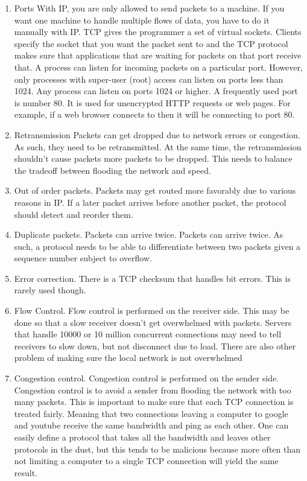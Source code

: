 \begin{enumerate}
  \item \gls{Ports}
  With IP, you are only allowed to send packets to a machine.
  If you want one machine to handle multiple flows of data, you have to do it manually with IP.
  TCP gives the programmer a set of virtual sockets.
  Clients specify the socket that you want the packet sent to and the TCP protocol makes sure that applications that are waiting for packets on that port receive that.
  A process can listen for incoming packets on a particular port.
  However, only processes with \gls{super-user} (root) access can listen on ports less than 1024.
  Any process can listen on ports 1024 or higher.
  A frequently used port is number 80.
  It is used for unencrypted HTTP requests or web pages.
  For example, if a web browser connects to  then it will be connecting to port 80.

\item \gls{Retransmission}
  Packets can get dropped due to network errors or congestion.
  As such, they need to be retransmitted.
  At the same time, the retransmission shouldn't cause packets more packets to be dropped.
  This needs to balance the tradeoff between flooding the network and speed.

\item Out of order packets.
  Packets may get routed more favorably due to various reasons in IP.
  If a later packet arrives before another packet, the protocol should detect and reorder them.

\item Duplicate packets.
  Packets can arrive twice.
  Packets can arrive twice.
  As such, a protocol needs to be able to differentiate between two packets given a sequence number subject to overflow.

\item Error correction.
  There is a TCP checksum that handles bit errors.
  This is rarely used though.

\item Flow Control.
  Flow control is performed on the receiver side.
  This may be done so that a slow receiver doesn't get overwhelmed with packets.
  Servers that handle 10000 or 10 million concurrent connections may need to tell receivers to slow down, but not disconnect due to load.
  There are also other problem of making sure the local network is not overwhelmed

\item Congestion control.
  Congestion control is performed on the sender side.
  Congestion control is to avoid a sender from flooding the network with too many packets.
  This is important to make sure that each TCP connection is treated fairly.
  Meaning that two connections leaving a computer to google and youtube receive the same bandwidth and ping as each other.
  One can easily define a protocol that takes all the bandwidth and leaves other protocols in the dust, but this tends to be malicious because more often than not limiting a computer to a single TCP connection will yield the same result.


\end{enumerate}
